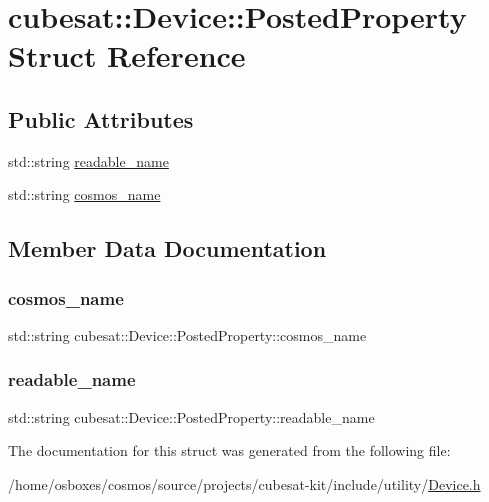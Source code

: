 \hypertarget{structcubesat_1_1Device_1_1PostedProperty}{}\section{cubesat\+:\+:Device\+:\+:Posted\+Property Struct Reference}
\label{structcubesat_1_1Device_1_1PostedProperty}
\subsection*{Public Attributes}
\begin{DoxyCompactItemize}
\item 
std\+::string \hyperlink{structcubesat_1_1Device_1_1PostedProperty_a566da00f8a06588980f3661bc7ab0442}{readable\+\_\+name}
\item 
std\+::string \hyperlink{structcubesat_1_1Device_1_1PostedProperty_a8bc44aa9e44c60a7d6371325de7ac285}{cosmos\+\_\+name}
\end{DoxyCompactItemize}


\subsection{Member Data Documentation}
\mbox{\label{structcubesat_1_1Device_1_1PostedProperty_a8bc44aa9e44c60a7d6371325de7ac285}} 
\subsubsection{\texorpdfstring{cosmos\+\_\+name}{cosmos\_name}}
{\footnotesize\ttfamily std\+::string cubesat\+::\+Device\+::\+Posted\+Property\+::cosmos\+\_\+name}

\mbox{\label{structcubesat_1_1Device_1_1PostedProperty_a566da00f8a06588980f3661bc7ab0442}} 
\subsubsection{\texorpdfstring{readable\+\_\+name}{readable\_name}}
{\footnotesize\ttfamily std\+::string cubesat\+::\+Device\+::\+Posted\+Property\+::readable\+\_\+name}



The documentation for this struct was generated from the following file\+:\begin{DoxyCompactItemize}
\item 
/home/osboxes/cosmos/source/projects/cubesat-\/kit/include/utility/\hyperlink{Device_8h}{Device.\+h}\end{DoxyCompactItemize}
